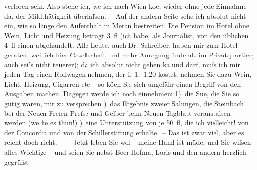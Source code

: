 \begin{ledgroupsized}[t]{13cm}
               verloren sein. Also stehe ich, we{\geminationn} ich nach Wien ko{\geminationm}e, wieder ohne
               jede Einnahme da, der Mildthätigkeit überlaſsen. – Auf der andern Seite sehe ich
               absolut nicht ein, wie so lange den Aufenthalt in Meran bestreiten. Die Pension im Hotel ohne Wein, Licht und Heizung beträgt
               3 fl (ich habe, als Journalist, von den üblichen 4 fl einen abgehandelt. Alle Leute,
               auch Dr. Schreiber, haben mir zum Hotel
               geraten, weil ich hier Gesellschaft und mehr Anregung finde als im Privatquartier;
               auch sei’s nicht teuerer); da ich absolut nicht gehen ka{\geminationn} und \uline{darf}, muſs ich mir jeden Tag einen Rollwagen
               nehmen, der fl 1.–1.20 kostet; nehmen Sie dazu Wein, Licht, Heizung, Cigarren etc –
               so kö{\geminationn}en Sie sich ungefähr einen Begriff von den
               Ausgaben machen. Dagegen werde ich noch einnehmen: \pend
           \pstart
           {\pb}1) die Su{\geminationm}e, die
               Sie so gütig waren, mir zu versprechen\pend
           ) das Ergebnis zweier Sa{\geminationm}lungen, die Steinbach bei der Neuen Freien Preſse und Gelber beim Neuen Tagblatt veranstalten
               werden (we{\geminationn}{ }ſie es thun!)\pend
           ) eine Unterstützung von je 50 fl, die ich vielleicht! von der Concordia und von der Schillerstiftung erhalte. – Das ist zwar viel, aber es reicht doch
               nicht. – –\pend
           \pstart
           Jetzt leben Sie wol – meine Hand ist müde, und Sie wiſsen alles Wichtige – und seien
               Sie nebst Beer-Hofma{\geminationn}, Loris und den andern herzlich gegrüſst

\end{ledgroupsized}
